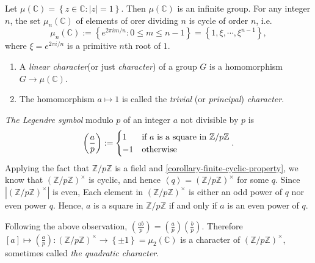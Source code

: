 Let \( \mu(\mathbb{C}) = \left\lbrace z \in \mathbb{C}: \left\vert z \right\vert = 1 \right\rbrace \).
Then \( \mu(\mathbb{C}) \) is an infinite group.
For any integer \( n \), the set \( \mu_n(\mathbb{C}) \) of elements of orer dividing \( n \) is cycle of order \( n \), i.e.
\[
  \mu_n(\mathbb{C}) := \left\lbrace e^{2\pi i m / n}: 0 \leq m \leq n - 1 \right\rbrace = \left\lbrace 1, \xi, \cdots, \xi^{n - 1} \right\rbrace,
\]
where \( \xi = e^{2 \pi i / n} \) is a primitive \( n \)th root of \( 1 \).
\begin{definition}
  \begin{enumerate}
    \item A \emph{linear character}(or just \emph{character}) of a group \( G \) is a homomorphism \( G \to \mu(\mathbb{C}) \).
    \item The homomorphism \( a \mapsto 1 \) is called the \emph{trivial} (or \emph{principal}) \emph{character}.
  \end{enumerate}
\end{definition}

\begin{example}
  \emph{The Legendre symbol} modulo \( p \) of an integer \( a \) not divisible
  by \( p \) is
  \[
    \left(\frac{a}{p}\right) := \begin{cases}
      1 &\textmd{if } a \textmd{ is a square in } \mathbb{Z} / p\mathbb{Z}\\
      -1 & \textmd{otherwise}
    \end{cases}.
  \]
  Applying the fact that \( \mathbb{Z} / p \mathbb{Z} \) is a field and
  \cref{corollary-finite-cyclic-property}, we know that \( (\mathbb{Z} / p
  \mathbb{Z})^{\times} \) is cyclic, and hence \( \left\langle q \right\rangle =
  (\mathbb{Z} / p \mathbb{Z})^{\times} \) for some \( q \). Since \( \left\lvert
    (\mathbb{Z} / p \mathbb{Z})^{\times} \right\rvert \) is even, Each element
    in \( (\mathbb{Z} / p \mathbb{Z})^{\times} \) is either an odd power of \( q
    \) nor even power \( q \). Hence, \( a \) is a square in \( \mathbb{Z} / p
    \mathbb{Z} \) if and only if \( a \) is an even power of \( q \).

  Following the above observation, \( \left(\frac{ab}{p}\right) =
  \left(\frac{a}{p}\right)\left(\frac{b}{p}\right) \). Therefore \( [a] \mapsto
  \left(\frac{a}{p}\right): \left(\mathbb{Z} / p \mathbb{Z}\right)^\times \to
  \left\lbrace \pm 1 \right\rbrace = \mu_2(\mathbb{C}) \) is a character of \(
  \left(\mathbb{Z} / p \mathbb{Z}\right)^\times \), sometimes called \emph{the
  quadratic character}.
\end{example}

